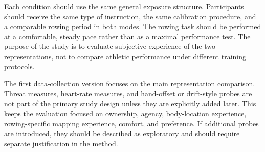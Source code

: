 Each condition should use the same general exposure structure.
Participants should receive the same type of instruction, the same calibration procedure, and a comparable rowing period in both modes.
The rowing task should be performed at a comfortable, steady pace rather than as a maximal performance test.
The purpose of the study is to evaluate subjective experience of the two representations, not to compare athletic performance under different training protocols.

The first data-collection version focuses on the main representation comparison.
Threat measures, heart-rate measures, and hand-offset or drift-style probes are not part of the primary study design unless they are explicitly added later.
This keeps the evaluation focused on ownership, agency, body-location experience, rowing-specific mapping experience, comfort, and preference.
If additional probes are introduced, they should be described as exploratory and should require separate justification in the method.
